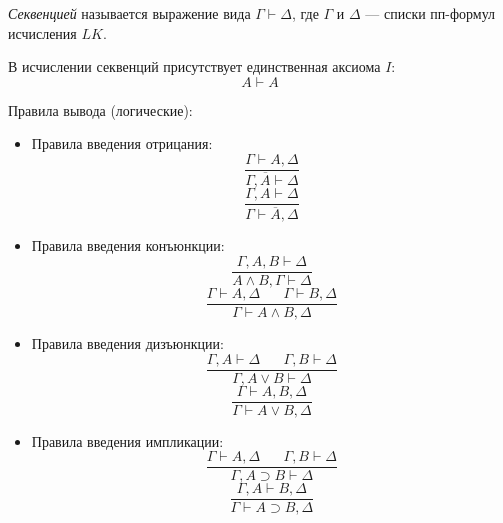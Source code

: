 \begin{definition}
    \textit{Секвенцией} называется выражение вида $\Gamma \vdash \Delta$, где $\Gamma$ и $\Delta$ --- списки пп-формул исчисления $LK$.
\end{definition}

В исчислении секвенций присутствует единственная аксиома $I$:
\begin{equation*}
    A\vdash A
\end{equation*}

Правила вывода (логические):
\begin{itemize}
    \item Правила введения отрицания:
    \begin{equation*}
        \frac{\Gamma\vdash A,\Delta}{\Gamma, \overline{A}\vdash \Delta} \tag{$\lnot_L$}
    \end{equation*}
    \begin{equation*}
        \frac{\Gamma, A\vdash \Delta}{\Gamma\vdash\overline{A}, \Delta} \tag{$\lnot_R$}
    \end{equation*}
    \item Правила введения конъюнкции: 
    \begin{equation*}
        \frac{\Gamma, A,B\vdash \Delta}{A\land B, \Gamma \vdash \Delta} \tag{$\land_L$}
    \end{equation*}
    \begin{equation*}
        \frac{\Gamma\vdash A, \Delta \;\;\;\;\;\; \Gamma\vdash B,\Delta}{\Gamma \vdash A\land B, \Delta} \tag{$\land_R$}
    \end{equation*}
    \item Правила введения дизъюнкции:
    \begin{equation*}
        \frac{\Gamma, A\vdash \Delta \;\;\;\;\;\; \Gamma, B \vdash \Delta}{\Gamma, A\lor B \vdash \Delta} \tag{$\lor_L$}
    \end{equation*}
    \begin{equation*}
        \frac{\Gamma\vdash A,B,\Delta}{\Gamma\vdash A\lor B, \Delta} \tag{$\lor_R$}
    \end{equation*}
    \item Правила введения импликации:
    \begin{equation*}
        \frac{\Gamma\vdash A, \Delta \;\;\;\;\;\; \Gamma, B\vdash \Delta}{\Gamma, A\supset B\vdash \Delta} \tag{$\supset_L$}
    \end{equation*}
    \begin{equation*}
        \frac{\Gamma, A\vdash B, \Delta}{\Gamma\vdash A\supset B, \Delta} \tag{$\supset_R$}
    \end{equation*}
\end{itemize}

